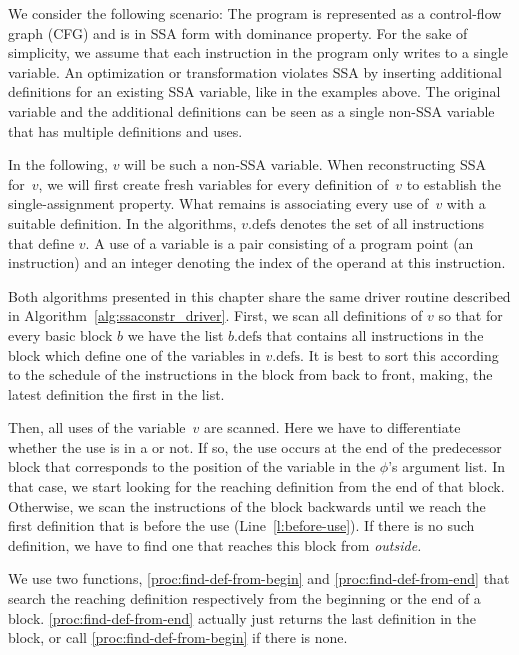 {We consider the following scenario: The program is represented as a control-flow graph (CFG) and is in SSA form with dominance property.
For the sake of simplicity, we assume that each instruction in the program only writes to a single variable.
An optimization or transformation violates SSA by inserting additional definitions for an existing SSA variable, like in the examples above.
The original variable and the additional definitions can be seen as a single non-SSA variable that has multiple definitions and uses.

In the following, $v$ will be such a non-SSA variable.
When reconstructing SSA for~$v$, we will first create fresh variables for every definition of~$v$ to establish the single-assignment property.
What remains is associating every use of~$v$ with a suitable definition.
In the algorithms, $v.\textrm{defs}$ denotes the set of all instructions that define $v$.
A use of a variable is a pair consisting of a program point (an instruction) and an integer denoting the index of the operand at this instruction.

Both algorithms presented in this chapter share the same driver routine
described in Algorithm~\ref{alg:ssaconstr_driver}.
First, we scan all definitions of $v$ so that
for every basic block $b$ we have the list $b.\textrm{defs}$ that contains all instructions in the block which define one of the variables in $v.\textrm{defs}$.
It is best to sort this according to the schedule of the instructions in the block from back to front, making, the latest definition the first in the list.

Then, all uses of the variable~$v$ are scanned.
Here we have to differentiate whether the use is in a \phifun or not.
If so, the use occurs at the end of the predecessor block that corresponds to the position of the variable in the $\phi$'s argument list.
In that case, we start looking for the reaching definition from the end of that block.
Otherwise, we scan the instructions of  the block backwards until we reach the first definition that is before the use (Line~\ref{l:before-use}).
If there is no such definition, we have to find one that reaches this block from \emph{outside.}

We use two functions, \ref{proc:find-def-from-begin} and \ref{proc:find-def-from-end} that search the reaching definition respectively from the beginning or the end of a block.
\ref{proc:find-def-from-end} actually just returns the last definition in the block, or call \ref{proc:find-def-from-begin} if there is none.

}

